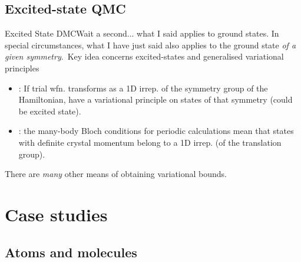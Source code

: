 \documentclass[12pt, pdf, hyperref={draft}, usenames, dvipsnames]{beamer}
\newcommand{\red}[1]{{\bf\color{LancsRed}{#1}}}
\newcommand{\green}[1]{{\bf\color{ForestGreen}{#1}}}
\begin{document}

\subsection{Excited-state QMC}


\begin{frame}{Excited State DMC}{Wait a second... what I said applies to ground
states.}
\vspace{0cm}
In special circumstances, what I have just said
also applies to the ground state {\it of a given
symmetry}.\footnotemark~Key idea concerns
excited-states and generalised variational principles

  \begin{itemize}
  \pause
    \item \red{Jargon}: If trial wfn. transforms as a 1D irrep. of the symmetry group
    of the Hamiltonian, have a variational principle on states of that
    symmetry (could be excited state).~
    \pause
    \item \green{Simple practical upshot}: the many-body Bloch conditions for periodic
    calculations mean that states with definite crystal momentum belong to a 1D
    irrep. (of the translation group).
  \end{itemize}
\vfill
There are {\it many} other means of obtaining variational
bounds.
\end{frame}


\section{Case studies}

\subsection{Atoms and molecules}

\end{document}
